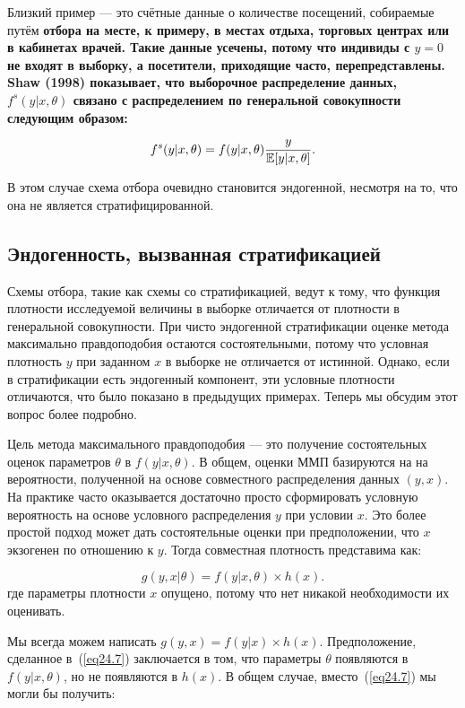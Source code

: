 Близкий пример --- это счётные данные о количестве посещений, собираемые путём \bfseries отбора на месте\mdseries, к примеру, в местах отдыха, торговых центрах или в кабинетах врачей. Такие данные усечены, потому что индивиды с $y=0$ не входят в выборку, а посетители, приходящие часто, перепредставлены. Shaw (1998) показывает, что выборочное распределение данных, $f^s(y|x,\theta)$ связано с распределением по генеральной совокупности следующим образом:

\[
f^s(y|x,\theta) = f(y|x,\theta) \frac{y}{\mathbb{E}[y|x,\theta]}.
\]

В этом случае схема отбора очевидно становится эндогенной, несмотря на то, что она не является стратифицированной. 

\subsection{Эндогенность, вызванная стратификацией}

Схемы отбора, такие как схемы со стратификацией, ведут к тому, что функция плотности исследуемой величины в выборке отличается от плотности в генеральной совокупности. При чисто эндогенной стратификации оценке метода максимально правдоподобия остаются состоятельными, потому что условная плотность $y$ при заданном $x$ в выборке не отличается от истинной. Однако, если в стратификации есть эндогенный компонент, эти условные плотности отличаются, что было показано в предыдущих примерах. Теперь мы обсудим этот вопрос более подробно. 

Цель метода максимального правдоподобия --- это получение состоятельных оценок параметров $\theta$ в $f(y|x, \theta)$. В общем, оценки ММП базируются на на вероятности, полученной на основе совместного распределения данных $(y, x)$. На практике часто оказывается достаточно просто сформировать условную вероятность на основе условного распределения $y$ при условии $x$. Это более простой подход может дать состоятельные оценки при предположении, что $x$ экзогенен по отношению к $y$. Тогда совместная плотность представима как:

\begin{equation}
\label{eq24.7}
g(y, x|\theta) = f (y| x, \theta) \times h(x). 
\end{equation}
где параметры плотности $x$ опущено, потому что нет никакой необходимости их оценивать. 

Мы всегда можем написать $g(y, x) = f (y| x) \times h(x)$. Предположение, сделанное в~(\ref{eq24.7}) заключается в том, что параметры $\theta$ появляются в $f(y | x, \theta)$, но не появляются в $h(x)$. В общем случае, вместо~(\ref{eq24.7}) мы могли бы получить:

